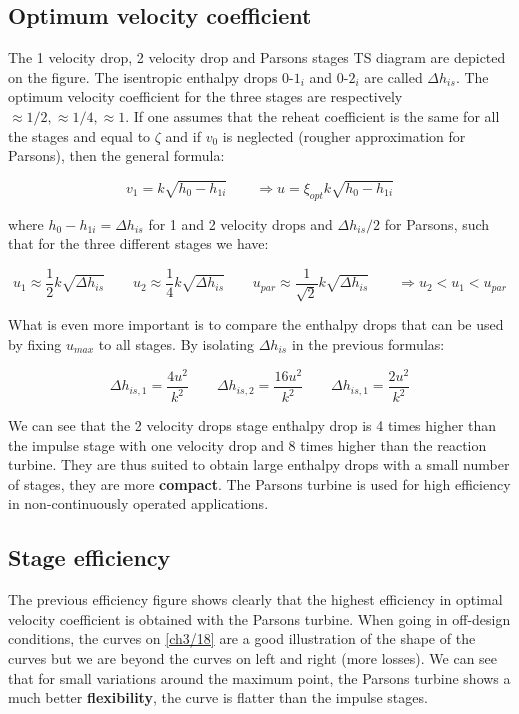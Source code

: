 \subsection{Optimum velocity coefficient}
The 1 velocity drop, 2 velocity drop and Parsons stages TS diagram are depicted on the figure. The isentropic enthalpy drops 0-$1_i$ and 0-$2_i$ are called $\Delta h_{is}$. The optimum velocity coefficient for the three stages are respectively $\approx 1/2, \approx 1/4, \approx 1$. If one assumes that the reheat coefficient is the same for all the stages and equal to $\zeta$ and if $v_0$ is neglected (rougher approximation for Parsons), then the general formula: 

\begin{equation}
v_1 = k \sqrt{h_0 - h_{1i}} \qquad \Rightarrow u = \xi _{opt} k \sqrt{h_0 - h_{1i}} 
\end{equation}

where $h_0 - h_{1i} = \Delta h_{is}$ for 1 and 2 velocity drops and $\Delta h_{is}/2$ for Parsons, such that for the three different stages we have: 

\begin{equation}
u_1 \approx \frac{1}{2}k \sqrt{\Delta h_{is}} \qquad u_2 \approx \frac{1}{4}k \sqrt{\Delta h_{is}} \qquad u_{par} \approx \frac{1}{\sqrt{2}}k \sqrt{\Delta h_{is}}\qquad \Rightarrow u_2 < u_1 < u_{par}
\end{equation}

What is even more important is to compare the enthalpy drops that can be used by fixing $u_{max}$ to all stages. By isolating $\Delta h_{is}$ in the previous formulas: 

\begin{equation}
\Delta h_{is, 1} = \frac{4u^2}{k^2} \qquad  \Delta h_{is, 2} = \frac{16u^2}{k^2} \qquad \Delta h_{is, 1} = \frac{2u^2}{k^2}
\end{equation}

We can see that the 2 velocity drops stage enthalpy drop is 4 times higher than the impulse stage with one velocity drop and 8 times higher than the reaction turbine. They are thus suited to obtain large enthalpy drops with a small number of stages, they are more \textbf{compact}. The Parsons turbine is used for high efficiency in non-continuously operated applications. 

\subsection{Stage efficiency}
The previous efficiency figure shows clearly that the highest efficiency in optimal velocity coefficient is obtained with the Parsons turbine. When going in off-design conditions, the curves on \autoref{ch3/18} are a good illustration of the shape of the curves but we are beyond the curves on left and right (more losses). We can see that for small variations around the maximum point, the Parsons turbine shows a much better \textbf{flexibility}, the curve is flatter than the impulse stages. 